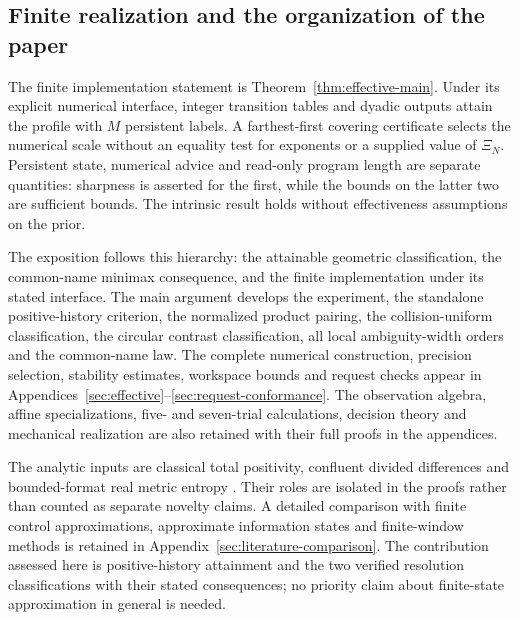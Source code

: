 \subsection{Finite realization and the organization of the paper}
The finite implementation statement is Theorem~\ref{thm:effective-main}.
Under its explicit numerical interface, integer transition tables and
dyadic outputs attain the profile with $M$ persistent labels. A
farthest-first covering certificate selects the numerical scale without
an equality test for exponents or a supplied value of $\Xi_N$.
Persistent state, numerical advice and read-only program length are
separate quantities: sharpness is asserted for the first, while the
bounds on the latter two are sufficient bounds. The intrinsic result
holds without effectiveness assumptions on the prior.

The exposition follows this hierarchy: the attainable geometric
classification, the common-name minimax consequence, and the finite
implementation under its stated interface. The main argument develops
the experiment, the standalone positive-history criterion, the normalized product
pairing, the collision-uniform classification, the circular contrast
classification, all local ambiguity-width orders and the common-name law.
The complete numerical construction, precision selection, stability
estimates, workspace bounds and request checks appear in
Appendices~\ref{sec:effective}--\ref{sec:request-conformance}.
The observation algebra, affine specializations, five- and seven-trial
calculations, decision theory and mechanical realization are also
retained with their full proofs in the appendices.

The analytic inputs are classical total positivity, confluent divided
differences and bounded-format real metric entropy
\cite{Pinkus,deBoor,YomdinComte,ZhangKileel,ComteHalupczok}.
Their roles are isolated in the proofs rather than counted as separate
novelty claims. A detailed comparison with finite control approximations,
approximate information states and finite-window methods is retained in
Appendix~\ref{sec:literature-comparison}. The contribution assessed here
is positive-history attainment and the two verified resolution
classifications with their stated consequences; no priority claim about finite-state approximation in
general is needed.
